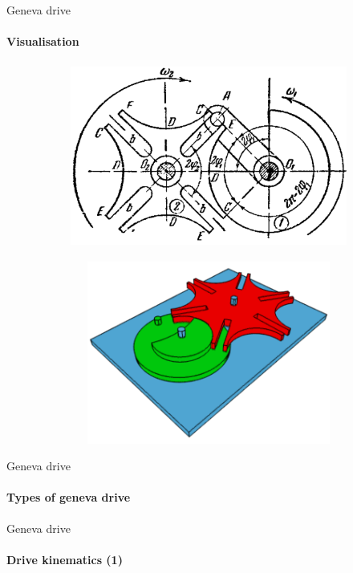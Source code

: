 \documentclass[aspectratio=169]{beamer}
\begin{document}
\begin{frame}[t]{Geneva drive}
    \framesubtitle{Visualisation}
    \vspace{-0.5cm}
    \begin{figure}[H]
        \begin{subfigure}{0.49\textwidth}
            \centering\includegraphics[height=6cm,width=1\textwidth,keepaspectratio]{geneva_kinematics.png}
        \end{subfigure}
        \begin{subfigure}{0.49\textwidth}
            \href{https://en.wikipedia.org/wiki/Geneva_drive\#/media/File:Geneva_mechanism_6spoke_animation.gif}{
                \centering\includegraphics[height=6cm,width=1\textwidth,keepaspectratio]{Geneva_drive_video_preview.png}}
        \end{subfigure}
    \end{figure}    
\end{frame}

\begin{frame}[t]{Geneva drive}
    \framesubtitle{Types of geneva drive}

\end{frame}

\begin{frame}[t]{Geneva drive}
    \framesubtitle{Drive kinematics (1)}

\end{frame}
\end{document}
